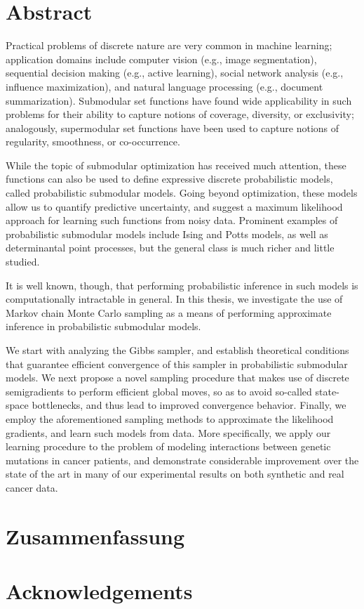 


\cleardoublepage
\section*{\centering Abstract}
\vspace{1em}
Practical problems of discrete nature are very common in machine learning; application domains include computer vision (e.g., image segmentation), sequential decision making (e.g., active learning), social network analysis (e.g., influence maximization), and natural language processing (e.g., document summarization).
Submodular set functions have found wide applicability in such problems for their ability to capture notions of coverage, diversity, or exclusivity; analogously, supermodular set functions have been used to capture notions of regularity, smoothness, or co-occurrence.

While the topic of submodular optimization has received much attention, these functions can also be used to define expressive discrete probabilistic models, called probabilistic submodular models.
Going beyond optimization, these models allow us to quantify predictive uncertainty, and suggest a maximum likelihood approach for learning such functions from noisy data.
Prominent examples of probabilistic submodular models include Ising and Potts models, as well as determinantal point processes, but the general class is much richer and little studied.

It is well known, though, that performing probabilistic inference in such models is computationally intractable in general.
In this thesis, we investigate the use of Markov chain Monte Carlo sampling as a means of performing approximate inference in probabilistic submodular models.

We start with analyzing the Gibbs sampler, and establish theoretical conditions that guarantee efficient convergence of this sampler in probabilistic submodular models.
We next propose a novel sampling procedure that makes use of discrete semigradients to perform efficient global moves, so as to avoid so-called state-space bottlenecks, and thus lead to improved convergence behavior.
Finally, we employ the aforementioned sampling methods to approximate the likelihood gradients, and learn such models from data.
More specifically, we apply our learning procedure to the problem of modeling interactions between genetic mutations in cancer patients, and demonstrate considerable improvement over the state of the art in many of our experimental results on both synthetic and real cancer data.

\cleardoublepage
\section*{Zusammenfassung}

\cleardoublepage
\section*{Acknowledgements}
\todo{}